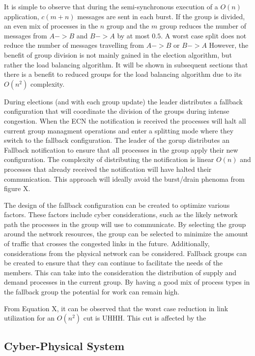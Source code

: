 It is simple to observe that during the semi-synchronous execution of a $O(n)$ application, $c(m+n)$ messages are sent in each burst.
If the group is divided, an even mix of processes in the $n$ group and the $m$ group reduces the number of messages from $A->B$ and $B->A$ by at most $0.5$.
A worst case split does not reduce the number of messages travelling from $A->B$ or $B->A$
However, the benefit of group division is not mainly gained in the election algorithm, but rather the load balancing algorithm.
It will be shown in subsequent sections that there is a benefit to reduced groups for the load balancing algorithm due to its $O(n^2)$ complexity.

During elections (and with each group update) the leader distributes a fallback configuration that will coordinate the division of the groups during intense congestion.
When the ECN the notification is received the processes will halt all current group managment operations and enter a splitting mode where they switch to the fallback configuration.
The leader of the gorup distributes an Fallback notification to ensure that all processes in the group apply their new configuration. 
The complexity of distributing the notification is linear $O(n)$ and processes that already received the notification will have halted their communication.
This approach will ideally avoid the burst/drain phenoma from figure X.

The design of the fallback configuration can be created to optimize various factors.
These factors include cyber considerations, such as the likely network path the processes in the group will use to communicate.
By selecting the group around the network resources, the group can be selected to minimize the amount of traffic that crosses the congested links in the future.
Additionally, considerations from the physical network can be considered.
Fallback groups can be created to ensure that they can continue to facilitate the needs of the members.
This can take into the consideration the distribution of supply and demand processes in the current group.
By having a good mix of process types in the fallback group the potential for work can remain high.

From Equation X, it can be observed that the worst case reduction in link utilization for an $O(n^2)$ cut is UHHH.
This cut is affected by the

\subsection{Cyber-Physical System}

